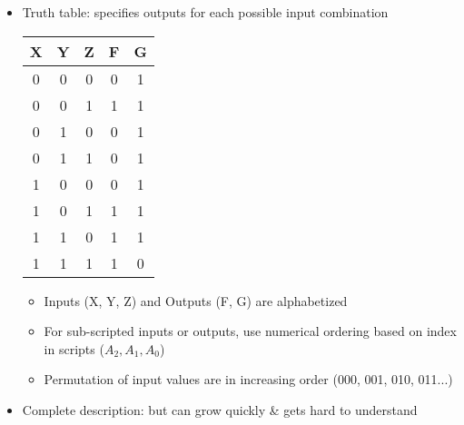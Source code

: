 \begin{frame}[fragile]
\begin{itemize}
	\item Truth table: specifies outputs for each possible input
combination 
\begin{multicols}{2}
 {\footnotesize
		\begin{center}\ifnum{}\huge\fi
		\begin{tabular}{ccc|cc}
		X&Y&Z & F & G \\\hline
		0&0&0 & 0 & 1 \\
		0&0&1 & 1 & 1 \\
		0&1&0 & 0 & 1 \\
		0&1&1 & 0 & 1 \\
		1&0&0 & 0 & 1 \\
		1&0&1 & 1 & 1 \\
		1&1&0 & 1 & 1 \\
		1&1&1 & 1 & 0 \\
		\end{tabular}

		\end{center}	
  
  }	

  \columnbreak

  \begin{tcolorbox}[enhanced,attach boxed title to top center={yshift=-3mm,yshifttext=-1mm},
  colback=green!5!white,colframe=green!75!black,colbacktitle=green!80!black,
  title=Remember It,fonttitle=\bfseries,
  boxed title style={size=small,colframe=green!50!black} ]
   {\footnotesize  \begin{itemize}
        \item Inputs (X, Y, Z) and Outputs (F, G) are alphabetized
        \item For sub-scripted inputs or outputs, use numerical ordering based on index in scripts ($A_2, A_1, A_0$)  
        \item Permutation of input values are in increasing order (000, 001, 010, 011...)
    \end{itemize}}
\end{tcolorbox}

\end{multicols}

	\item Complete description: but can grow quickly \& gets hard to understand

\end{itemize}
\end{frame}
